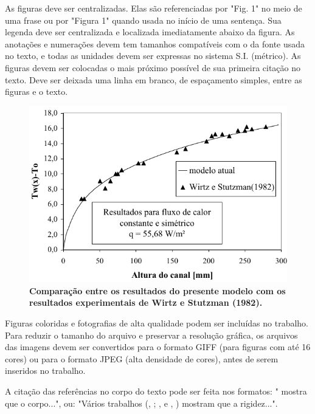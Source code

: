 \documentclass[10pt,fleqn,a4paper]{article}
\begin{document}
        As figuras deve ser centralizadas. Elas são referenciadas por "Fig. 1" no meio de uma frase ou por "Figura 1" quando usada no início de uma sentença. Sua legenda deve ser centralizada e localizada imediatamente abaixo da figura. As anotações e numerações devem tem tamanhos compatíveis com o da fonte usada no texto, e todas as unidades devem ser expressas no sistema S.I. (métrico). As figuras devem ser colocadas o mais próximo possível de sua primeira citação no texto. Deve ser deixada uma linha em branco, de espaçamento simples, entre as figuras e o texto.
    
        \begin{figure}[h]
            \begin{center}
                \includegraphics[angle=0, scale=.8]{figura.pdf}
            \end{center}
            \caption{\textbf{Comparação entre os resultados do presente modelo com os resultados experimentais de Wirtz e Stutzman (1982).}}
        \end{figure}

        Figuras coloridas e fotografias de alta qualidade podem ser incluídas no trabalho. Para reduzir o tamanho do arquivo e preservar a resolução gráfica, os arquivos das imagens devem ser convertidos para o  formato GIFF (para figuras com até 16 cores) ou para o formato JPEG (alta densidade de cores), antes de serem inseridos no trabalho.

        A citação das referências no corpo do texto pode ser feita nos formatos: "\citet{Bordalo89} mostra que o corpo...", ou: "Vários trabalhos (\citeauthor{Coimbra78}, \citeyear{Coimbra78}; \citeauthor{Clark86}, \citeyear{Clark86} e \citeauthor{Sparrow80},  \citeyear{Sparrow80}) mostram que a rigidez...".
\end{document}
